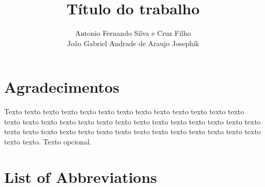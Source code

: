 \documentclass[a4paper,12pt,twoside,brazilian,english]{book}
\title{Título do trabalho}[um subtítulo]
\author[mas]{Antonio Fernando Silva e Cruz Filho \\ João Gabriel Andrade de Araujo Josephik}
\begin{document}

\frontmatter

\pagestyle{plain}

\onehalfspacing %

\maketitle %




\chapter*{Agradecimentos}

Texto texto texto texto texto texto texto texto texto texto texto texto texto
texto texto texto texto texto texto texto texto texto texto texto texto texto
texto texto texto texto texto texto texto texto texto texto texto texto texto
texto texto texto texto. Texto opcional.




\cleardoublepage

\newcommand\disablenewpage[1]{{\let\clearpage\par\let\cleardoublepage\par #1}}

\bgroup
\raggedbottom


\disablenewpage{\chapter*{List of Abbreviations}}
\end{document}
